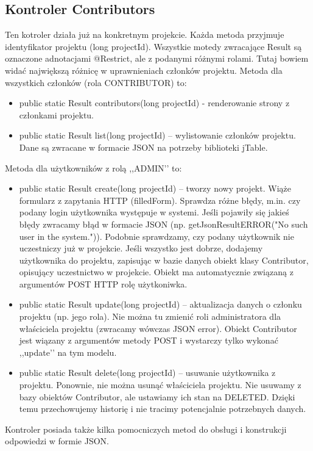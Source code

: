 \documentclass[a4paper,12pt,notitlepage]{mwrep}
\begin{document}
\subsection{Kontroler Contributors}
Ten kotroler działa już na konkretnym projekcie. Każda metoda przyjmuje identyfikator projektu
(long projectId). Wszystkie motedy zwracające Result są oznaczone adnotacjami @Restrict,
ale z podanymi różnymi rolami. Tutaj bowiem widać największą różnicę w uprawnieniach
członków projektu. Metoda dla wszystkich członków (rola CONTRIBUTOR) to:
\begin{itemize}
    \item    public static Result contributors(long projectId) - renderowanie strony z
        członkami projektu.
    \item    public static Result list(long projectId) -- wylistowanie członków projektu. Dane są
        zwracane w formacie JSON na potrzeby biblioteki jTable.
\end{itemize}
Metoda dla użytkowników z rolą ,,ADMIN’’ to:
\begin{itemize}
    \item    public static Result create(long projectId) -- tworzy nowy projekt. Wiąże formularz
        z zapytania HTTP (filledForm). Sprawdza różne błędy, m.in. czy podany login
        użytkownika występuje w systemi. Jeśli pojawiły się jakieś błędy zwracamy błąd
        w formacie JSON (np. getJsonResultERROR("No such user in the system.")).
        Podobnie sprawdzamy, czy podany użytkownik nie uczestniczy już w projekcie.
        Jeśli wszystko jest dobrze, dodajemy użytkownika do projektu, zapisując w bazie
        danych obiekt klasy Contributor, opisujący uczestnictwo w projekcie. Obiekt ma
        automatycznie związaną z argumentów POST HTTP rolę użytkoniwka.
    \item    public static Result update(long projectId) -- aktualizacja danych o członku
        projektu (np. jego rola). Nie można tu zmienić roli administratora dla właściciela
        projektu (zwracamy wówczas JSON error). Obiekt Contributor jest wiązany z
        argumentów metody POST i wystarczy tylko wykonać ,,update’’ na tym modelu.
    \item    public static Result delete(long projectId) -- usuwanie użytkownika z projektu.
        Ponownie, nie można usunąć właściciela projektu. Nie usuwamy z bazy obiektów
        Contributor, ale ustawiamy ich stan na DELETED. Dzięki temu przechowujemy
        historię i nie tracimy potencjalnie potrzebnych danych.
\end{itemize}
Kontroler posiada także kilka pomocniczych metod do obsługi i konstrukcji odpowiedzi w formie
JSON.
\end{document}
